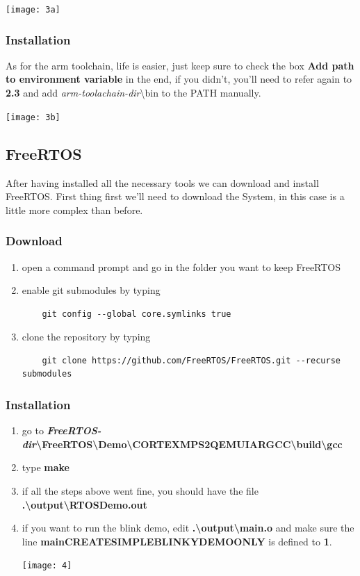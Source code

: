 \documentclass{exam}
\begin{document}
\texttt{[image: 3a]}

\subsubsection{Installation} 
As for the arm toolchain, life is easier, just keep sure to check the box \textbf{Add path to environment variable} in the end, if you didn't, you'll need to refer again to \textbf{2.3} and add \textit{arm-toolachain-dir}\textbackslash bin to the PATH manually.

\texttt{[image: 3b]}

\subsection{FreeRTOS}

After having installed all the necessary tools we can download and install FreeRTOS. First thing first we'll need to download the System, in this case is a little more complex than before.

\subsubsection{Download}
    \begin{enumerate}
        \item open a command prompt and go in the folder you want to keep FreeRTOS
        \item enable git submodules by typing
\begin{lstlisting}
    git config --global core.symlinks true
\end{lstlisting}
        \item clone the repository by typing
\begin{lstlisting}
    git clone https://github.com/FreeRTOS/FreeRTOS.git --recurse submodules
\end{lstlisting}
    \end{enumerate}

\subsubsection{Installation}
    \begin{enumerate}
        \item go to \textbf{\textit{FreeRTOS-dir}\textbackslash FreeRTOS\textbackslash Demo\textbackslash CORTEX\textunderscore MPS2\textunderscore QEMU\textunderscore IAR\textunderscore GCC\textbackslash build\textbackslash gcc}
        \item type \textbf{make}
        \item if all the steps above went fine, you should have the file \textbf{.\textbackslash output\textbackslash RTOSDemo.out}
        \item if you want to run the blink demo, edit \textbf{.\textbackslash output\textbackslash main.o} and make sure the line \textbf{mainCREATE\textunderscore SIMPLE\textunderscore BLINKY\textunderscore DEMO\textunderscore ONLY} is defined to \textbf{1}.

        \texttt{[image: 4]}
    \end{enumerate}
    
\end{document}
